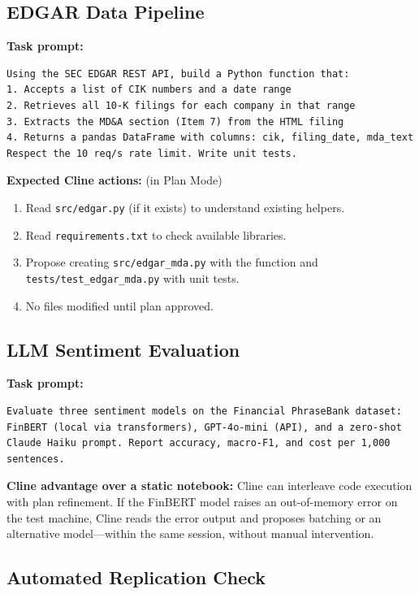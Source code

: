\subsection{EDGAR Data Pipeline}
\label{app:cline:finance-edgar}

\textbf{Task prompt:}
\begin{verbatim}
Using the SEC EDGAR REST API, build a Python function that:
1. Accepts a list of CIK numbers and a date range
2. Retrieves all 10-K filings for each company in that range
3. Extracts the MD&A section (Item 7) from the HTML filing
4. Returns a pandas DataFrame with columns: cik, filing_date, mda_text
Respect the 10 req/s rate limit. Write unit tests.
\end{verbatim}

\textbf{Expected Cline actions:} (in Plan Mode)
\begin{enumerate}
  \item Read \texttt{src/edgar.py} (if it exists) to understand existing helpers.
  \item Read \texttt{requirements.txt} to check available libraries.
  \item Propose creating \texttt{src/edgar\_mda.py} with the function and
        \texttt{tests/test\_edgar\_mda.py} with unit tests.
  \item No files modified until plan approved.
\end{enumerate}

\subsection{LLM Sentiment Evaluation}
\label{app:cline:finance-sentiment}

\textbf{Task prompt:}
\begin{verbatim}
Evaluate three sentiment models on the Financial PhraseBank dataset:
FinBERT (local via transformers), GPT-4o-mini (API), and a zero-shot
Claude Haiku prompt. Report accuracy, macro-F1, and cost per 1,000 sentences.
\end{verbatim}

\textbf{Cline advantage over a static notebook:}  Cline can interleave code
execution with plan refinement.  If the FinBERT model raises an out-of-memory
error on the test machine, Cline reads the error output and proposes batching
or an alternative model---within the same session, without manual intervention.

\subsection{Automated Replication Check}
\label{app:cline:finance-replication}

